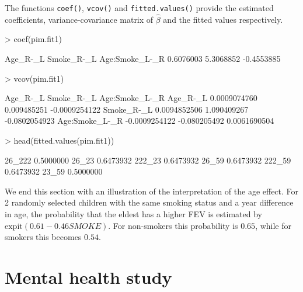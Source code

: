 \documentclass[12pt]{article}
\begin{document}
The functions \texttt{coef()}, \texttt{vcov()} and \texttt{fitted.values()} provide the estimated coefficients, variance-covariance matrix of $\hat{\beta}$ and the fitted values respectively. 
\begin{Schunk}
\begin{Sinput}
> coef(pim.fit1)
\end{Sinput}
\begin{Soutput}
      Age_R-_L     Smoke_R-_L Age:Smoke_L-_R 
     0.6076003      5.3068852     -0.4553885 
\end{Soutput}
\begin{Sinput}
> vcov(pim.fit1)
\end{Sinput}
\begin{Soutput}
                    Age_R-_L   Smoke_R-_L Age:Smoke_L-_R
Age_R-_L        0.0009074760  0.009485251  -0.0009254122
Smoke_R-_L      0.0094852506  1.090409267  -0.0802054923
Age:Smoke_L-_R -0.0009254122 -0.080205492   0.0061690504
\end{Soutput}
\begin{Sinput}
> head(fitted.values(pim.fit1))
\end{Sinput}
\begin{Soutput}
            [,1]
26_222 0.5000000
26_23  0.6473932
222_23 0.6473932
26_59  0.6473932
222_59 0.6473932
23_59  0.5000000
\end{Soutput}
\end{Schunk}

We end this section with an illustration of the interpretation of the age effect. For 2 randomly selected children with the same smoking status and a year difference in age, the probability that the eldest has a higher FEV is estimated by $\text{expit}(0.61 - 0.46SMOKE)$. For non-smokers this probability is $0.65$, while for smokers this becomes $0.54$.

\section{Mental health study}
\end{document}
